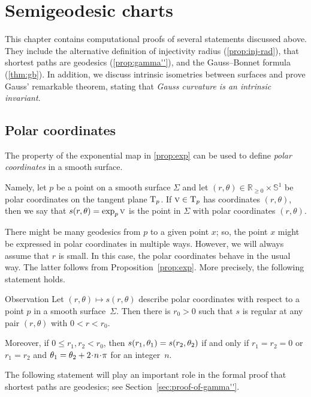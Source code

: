 \chapter{Semigeodesic charts}
\label{chap:semigeodesic}

This chapter contains computational proofs of several statements discussed above.
They include 
the alternative definition of injectivity radius (\ref{prop:inj-rad}),
that shortest paths are geodesics (\ref{prop:gamma''}),
and the Gauss--Bonnet formula (\ref{thm:gb}).
In addition, we discuss intrinsic isometries between surfaces and prove Gauss' remarkable theorem, stating that \textit{Gauss curvature is an intrinsic invariant}.

\section{Polar coordinates}\label{sec:Polar coordinates}

The property of the exponential map in \ref{prop:exp} can be used to define \emph{polar coordinates} in a smooth surface.

Namely, let $p$ be a point on a smooth surface $\Sigma$ and
let $(r,\theta) \in \mathbb{R}_{\ge0} \times \mathbb{S}^1$ be polar coordinates  on the tangent plane $\mathrm{T}_p$.
If $\text{\sc{v}}\in \mathrm{T}_p$ has coordinates $(r,\theta)$,
then we say that $s(r,\theta)\z=\exp_p\vec v$ is the point in $\Sigma$ with  polar coordinates $(r,\theta)$.

There might be many geodesics from $p$ to a given point $x$;
so, the point $x$ might be expressed in polar coordinates in multiple ways.
However, we will always assume that $r$ is small.
In this case, the polar coordinates behave in the usual way.
The latter follows from Proposition~\ref{prop:exp}.
More precisely, the following statement holds.

\begin{thm}{Observation}\label{obs:polar}
Let $(r,\theta)\mapsto s(r,\theta)$ describe polar coordinates with respect to a point $p$ in a  smooth surface~$\Sigma$.
Then there is $r_0>0$ such that $s$ is  regular at any pair $(r,\theta)$ with $0<r<r_0$.

Moreover, if $0\le r_1,r_2<r_0$, then $s(r_1,\theta_1) \z= s(r_2,\theta_2)$ if and only if
$r_1=r_2=0$ or $r_1=r_2$ and $\theta_1\z=\theta_2+2\cdot n\cdot\pi$ for an integer~$n$.
\end{thm}

The following statement will play an important role in the formal proof that shortest paths are geodesics; see Section~\ref{sec:proof-of-gamma''}.

